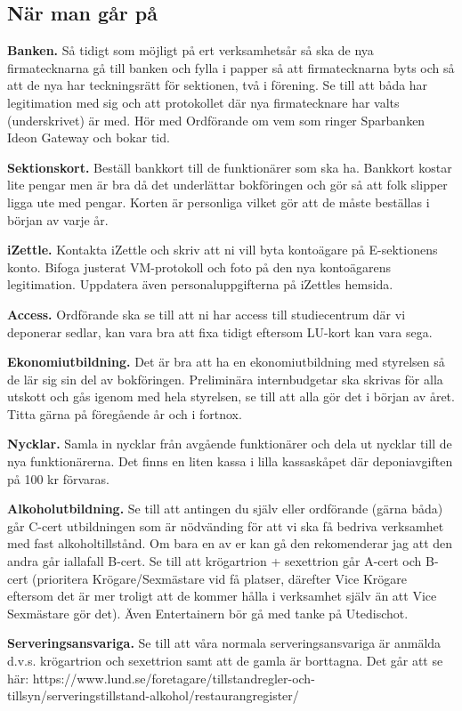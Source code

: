 \documentclass[10pt]{article}
\begin{document}
\subsection{När man går på}
\textbf{Banken.} Så tidigt som möjligt på ert verksamhetsår så ska de nya firmatecknarna gå till banken och fylla i papper så att firmatecknarna byts och så att de nya har teckningsrätt för sektionen, två i förening. Se till att båda har legitimation med sig och att protokollet där nya firmatecknare har valts (underskrivet) är med. Hör med Ordförande om vem som ringer Sparbanken Ideon Gateway och bokar tid.

\textbf{Sektionskort.} Beställ bankkort till de funktionärer som ska ha. Bankkort kostar lite pengar men är bra då det underlättar bokföringen och gör så att folk slipper ligga ute med pengar. Korten är personliga vilket gör att de måste beställas i början av varje år.

\textbf{iZettle.} Kontakta iZettle och skriv att ni vill byta kontoägare på E-sektionens konto. Bifoga justerat VM-protokoll och foto på den nya kontoägarens legitimation. Uppdatera även personaluppgifterna på iZettles hemsida.

\textbf{Access.} Ordförande ska se till att ni har access till studiecentrum där vi deponerar sedlar, kan vara bra att fixa tidigt eftersom LU-kort kan vara sega.

\textbf{Ekonomiutbildning.} Det är bra att ha en ekonomiutbildning med styrelsen så de lär sig sin del av bokföringen. Preliminära internbudgetar ska skrivas för alla utskott och gås igenom med hela styrelsen, se till att alla gör det i början av året. Titta gärna på föregående år och i fortnox.

\textbf{Nycklar. }Samla in nycklar från avgående funktionärer och dela ut nycklar till de nya funktionärerna. Det finns en liten kassa i lilla kassaskåpet där deponiavgiften på 100 kr förvaras.

\textbf{Alkoholutbildning.} Se till att antingen du själv eller ordförande (gärna båda) går C-cert utbildningen som är nödvänding för att vi ska få bedriva verksamhet med fast alkoholtillstånd. Om bara en av er kan gå den rekomenderar jag att den andra går iallafall B-cert.
Se till att krögartrion + sexettrion går A-cert och B-cert (prioritera Krögare/Sexmästare vid få platser, därefter Vice Krögare eftersom det är mer troligt att de kommer hålla i verksamhet själv än att Vice Sexmästare gör det). Även Entertainern bör gå med tanke på Utedischot.

\textbf{Serveringsansvariga. }Se till att våra normala serveringsansvariga är anmälda d.v.s. krögartrion och sexettrion samt att de gamla är borttagna. Det går att se här: https://www.lund.se/foretagare/tillstandregler-och-tillsyn/serveringstillstand-alkohol/restaurangregister/
\end{document}
